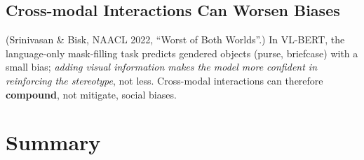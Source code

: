 \documentclass[11pt,a4paper]{article}
\theoremstyle{definition}
\theoremstyle{plain}
\theoremstyle{remark}
\begin{document}
\subsection{Cross-modal Interactions Can Worsen Biases}

(Srinivasan \& Bisk, NAACL 2022, ``Worst of Both Worlds''.) In VL-BERT, the language-only mask-filling task predicts gendered objects (purse, briefcase) with a small bias; \emph{adding visual information makes the model more confident in reinforcing the stereotype}, not less. Cross-modal interactions can therefore \textbf{compound}, not mitigate, social biases.


\section{Summary}
\end{document}
